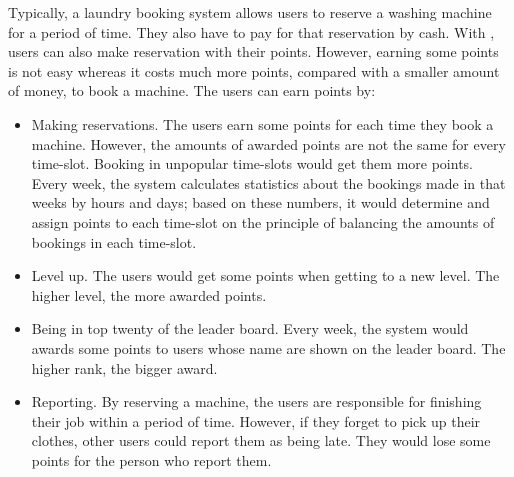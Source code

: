 Typically, a laundry booking system allows users to reserve a washing machine for a period of time. They also have to pay for that reservation by cash. With {\toolname}, users can also make reservation with their points. However, earning some points is not easy whereas it costs much more points, compared with a smaller amount of money, to book a machine. The users can earn points by:
\begin{itemize}
\item Making reservations. The users earn some points for each time they book a machine. However, the amounts of awarded points are not the same for every time-slot. Booking in unpopular time-slots would get them more points. Every week, the system calculates statistics about the bookings made in that weeks by hours and days; based on these numbers, it would determine and assign points to each time-slot on the principle of balancing the amounts of bookings in each time-slot.
\item Level up. The users would get some points when getting to a new level. The higher level, the more awarded points.
\item Being in top twenty of the leader board. Every week, the system would awards some points to users whose name are shown on the leader board. The higher rank, the bigger award.
\item Reporting. By reserving a machine, the users are responsible for finishing their job within a period of time. However, if they forget to pick up their clothes, other users could report them as being late. They would lose some points for the person who report them.
\end{itemize}